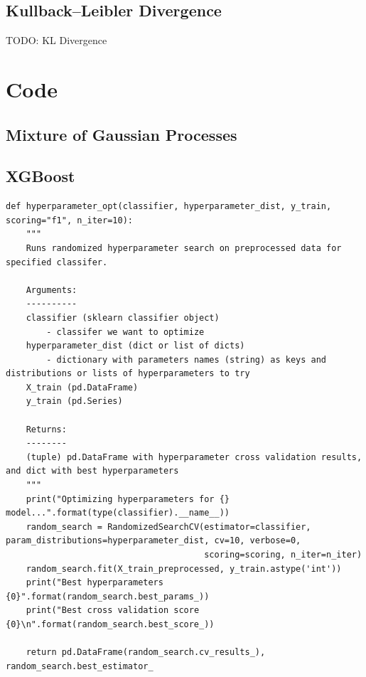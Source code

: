 \documentclass[12pt,a4paper]{report}
\theoremstyle{definition}
\begin{document}
\section{Kullback–Leibler Divergence} \label{sec:KLDiv}

TODO: KL Divergence

\chapter{Code}

\section{Mixture of Gaussian Processes}

\section{XGBoost}

\begin{lstlisting}[label=code:HyperParamXG,  caption={Hyperparameter optimisation for XGBoost classifier}]
def hyperparameter_opt(classifier, hyperparameter_dist, y_train, scoring="f1", n_iter=10):
    """
    Runs randomized hyperparameter search on preprocessed data for specified classifer.

    Arguments:
    ----------
    classifier (sklearn classifier object)
        - classifer we want to optimize
    hyperparameter_dist (dict or list of dicts)
        - dictionary with parameters names (string) as keys and distributions or lists of hyperparameters to try
    X_train (pd.DataFrame)
    y_train (pd.Series)

    Returns:
    --------
    (tuple) pd.DataFrame with hyperparameter cross validation results, and dict with best hyperparameters
    """
    print("Optimizing hyperparameters for {} model...".format(type(classifier).__name__))
    random_search = RandomizedSearchCV(estimator=classifier, param_distributions=hyperparameter_dist, cv=10, verbose=0,
                                       scoring=scoring, n_iter=n_iter)
    random_search.fit(X_train_preprocessed, y_train.astype('int'))
    print("Best hyperparameters {0}".format(random_search.best_params_))
    print("Best cross validation score {0}\n".format(random_search.best_score_))

    return pd.DataFrame(random_search.cv_results_), random_search.best_estimator_
\end{lstlisting}
\end{document}

